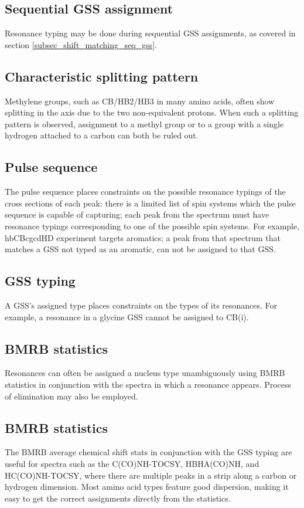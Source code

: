 \subsection*{Sequential GSS assignment}
Resonance typing may be done during sequential GSS assignments, as covered
in section \ref{subsec_shift_matching_seq_gss}.

\subsection*{Characteristic splitting pattern}
Methylene groups, such as CB/HB2/HB3 in many amino acids, often show 
splitting in the \nmrisoh{} axis due to the two non-equivalent protons.  When such 
a splitting pattern is observed, assignment to a methyl group or to a group
with a single hydrogen attached to a carbon can both be ruled out.

\subsection*{Pulse sequence}
The pulse sequence places constraints on the possible resonance typings of the
cross sections of each peak: there is a limited list of spin systems which the
pulse sequence is capable of capturing; each peak from the spectrum must have
resonance typings corresponding to one of the possible spin systems.
For example, hbCBcgcdHD experiment targets aromatics; a peak from that spectrum
that matches a GSS not typed as an aromatic, can not be assigned 
to that GSS.

\subsection*{GSS typing}
A GSS's assigned type places constraints on the types of its resonances.
For example, a resonance in a glycine GSS cannot be assigned to CB(i).

\subsection*{BMRB statistics}
Resonances can often be assigned a nucleus type unambiguously using BMRB
statistics in conjunction with the spectra in which a resonance appears.  
Process of elimination may also be employed.

\subsection*{BMRB statistics}
The BMRB average chemical shift stats in conjunction with the GSS typing
are useful for spectra such as the C(CO)NH-TOCSY, HBHA(CO)NH, and 
HC(CO)NH-TOCSY, where there are multiple peaks in a strip along a carbon or
hydrogen dimension. Most amino acid types feature good dispersion, making it 
easy to get the correct assignments directly from the statistics.

